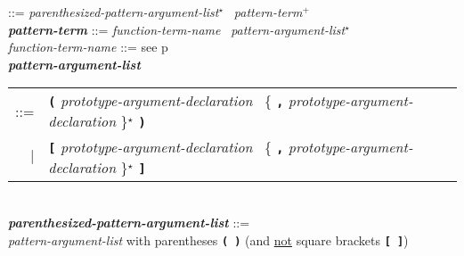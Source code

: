 \documentclass[12pt]{article}
\newcommand{\TT}[1]{{\tt \bfseries #1}}
\newcommand{\STAR}{{\Large $^\star$}}
\newcommand{\PLUS}[1][]{{$^{+#1}$}}
\newcommand{\emkey}[1]{{\em \bfseries #1}}
\newcommand{\pagref}[1]{p\pageref{#1}}
\newenvironment{indpar}[1][0.3in]%
	{\begin{list}{}%
		     {\setlength{\itemsep}{0in}%
		      \setlength{\topsep}{0in}%
		      \setlength{\parsep}{1ex}%
		      \setlength{\labelwidth}{#1}%
		      \setlength{\leftmargin}{#1}%
		      \addtolength{\leftmargin}{\labelsep}}%
	 \item}%
	{\end{list}}
\begin{document}
\begin{indpar}[0.1in]
    ::= {\em parenthesized-pattern-argument-list}\STAR{}~
        {\em pattern-term}\PLUS{}
\\[0.5ex]
\emkey{pattern-term}\label{PATTERN-TERM}
    ::= {\em function-term-name}~ {\em pattern-argument-list}\STAR{}
\\[0.5ex]
{\em function-term-name} ::= see \pagref{FUNCTION-TERM-NAME}
\\[0.5ex]
\emkey{pattern-argument-list}\label{PATTERN-ARGUMENT-LIST} \\
\hspace*{0.5in}
    \begin{tabular}[t]{@{}rl}
    ::= & \TT{(} {\em prototype-argument-declaration}~
	     \{ \TT{,} {\em prototype-argument-declaration} \}\STAR{} \TT{)} \\
    $|$ & \TT{[} {\em prototype-argument-declaration}~
	     \{ \TT{,} {\em prototype-argument-declaration} \}\STAR{} \TT{]} \\
    \end{tabular}
\\[0.5ex]
\emkey{parenthesized-pattern-argument-list}%
    \label{PARENTHESIZED-PATTERN-ARGUMENT-LIST} ::= \\
\hspace*{0.5in}
    {\em pattern-argument-list} with parentheses \TT{(~)}
    (and \underline{not} square brackets \TT{[~]})
\end{indpar}
\end{document}
